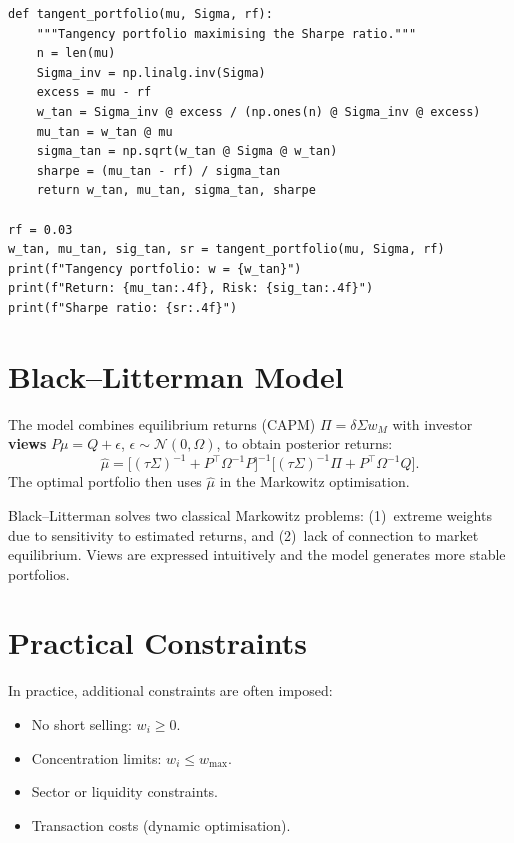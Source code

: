 \begin{codeblock}[title=\textbf{Tangency Portfolio (Maximum Sharpe)}]
\begin{verbatim}
def tangent_portfolio(mu, Sigma, rf):
    """Tangency portfolio maximising the Sharpe ratio."""
    n = len(mu)
    Sigma_inv = np.linalg.inv(Sigma)
    excess = mu - rf
    w_tan = Sigma_inv @ excess / (np.ones(n) @ Sigma_inv @ excess)
    mu_tan = w_tan @ mu
    sigma_tan = np.sqrt(w_tan @ Sigma @ w_tan)
    sharpe = (mu_tan - rf) / sigma_tan
    return w_tan, mu_tan, sigma_tan, sharpe

rf = 0.03
w_tan, mu_tan, sig_tan, sr = tangent_portfolio(mu, Sigma, rf)
print(f"Tangency portfolio: w = {w_tan}")
print(f"Return: {mu_tan:.4f}, Risk: {sig_tan:.4f}")
print(f"Sharpe ratio: {sr:.4f}")
\end{verbatim}
\end{codeblock}

\section{Black--Litterman Model}

\begin{definition}
The model combines equilibrium returns (CAPM) $\Pi = \delta\Sigma w_M$
with investor \textbf{views} $P\mu = Q + \epsilon$,
$\epsilon \sim \mathcal{N}(0, \Omega)$, to obtain posterior returns:
\[
    \hat{\mu} = \bigl[(\tau\Sigma)^{-1} + P^\top\Omega^{-1}P\bigr]^{-1}
    \bigl[(\tau\Sigma)^{-1}\Pi + P^\top\Omega^{-1}Q\bigr].
\]
The optimal portfolio then uses $\hat{\mu}$ in the Markowitz optimisation.
\end{definition}

\begin{intuition}[title=\textbf{Advantage of Black--Litterman}]
Black--Litterman solves two classical Markowitz problems: (1)~extreme
weights due to sensitivity to estimated returns, and (2)~lack of
connection to market equilibrium. Views are expressed intuitively and
the model generates more stable portfolios.
\end{intuition}

\section{Practical Constraints}

\begin{remark}
In practice, additional constraints are often imposed:
\begin{itemize}
    \item No short selling: $w_i \geq 0$.
    \item Concentration limits: $w_i \leq w_{\max}$.
    \item Sector or liquidity constraints.
    \item Transaction costs (dynamic optimisation).
\end{itemize}
\end{remark}

